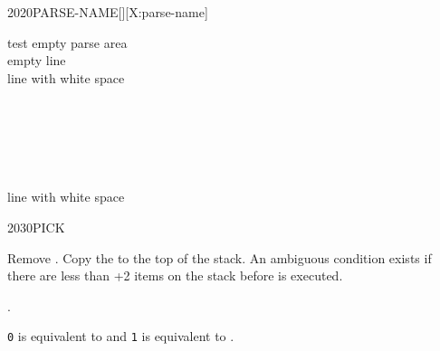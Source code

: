 \begin{worddef}{2020}{PARSE-NAME}[][X:parse-name]
\begin{testing}
		 test empty parse area \\
		 \tab {} empty line \\
		 \tab {} line with white space


		 \\
		 \\
		 \\
		 \\
		 \\
		\tab {} line with white space
	\end{testing}
\end{worddef}


\begin{worddef}{2030}{PICK}
\item {}

	Remove . Copy the  to the top of the stack.
	An ambiguous condition exists if there are less than +2
	items on the stack before  is executed.

\see {}.

	\begin{rationale} %
		\texttt{0}  is equivalent to  and
		\texttt{1}  is equivalent to .
	\end{rationale}
\end{worddef}


%
%
%


